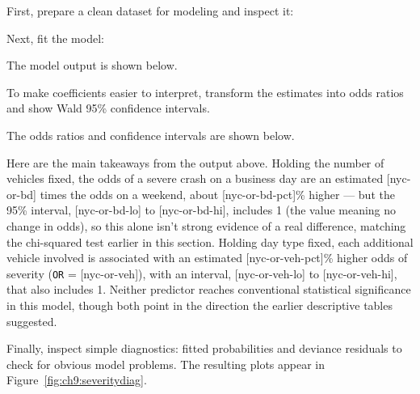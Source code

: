 First, prepare a clean dataset for modeling and inspect it:


Next, fit the model:


The model output is shown below.

To make coefficients easier to interpret, transform the estimates into
odds ratios and show Wald 95\% confidence intervals.


The odds ratios and confidence intervals are shown below.

Here are the main takeaways from the output above.
Holding the number of vehicles fixed, the odds of a severe crash on a
business day are an estimated
[nyc-or-bd] times
the odds on a weekend, about
[nyc-or-bd-pct]\%
higher --- but the 95\% interval,
[nyc-or-bd-lo]
to [nyc-or-bd-hi],
includes 1 (the value meaning no change in odds), so this alone isn't
strong evidence of a real difference,
matching the chi-squared test earlier in this section. Holding day
type fixed, each additional vehicle involved is associated with an
estimated
[nyc-or-veh-pct]\%
higher odds of severity
(\lstinline{OR} = [nyc-or-veh]),
with an interval,
[nyc-or-veh-lo]
to [nyc-or-veh-hi],
that also includes 1. Neither predictor reaches conventional
statistical significance in this model, though both point in the
direction the earlier descriptive tables suggested.

Finally, inspect simple diagnostics: fitted probabilities and deviance
residuals to check for obvious model problems. The resulting plots appear in
Figure~\ref{fig:ch9:severitydiag}.



